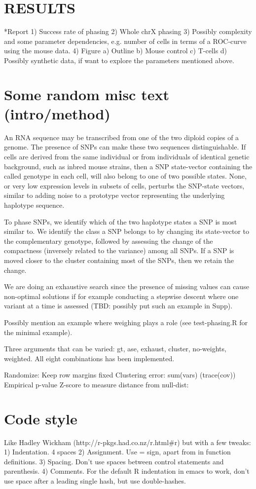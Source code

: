 \section{RESULTS}
*Report
1) Success rate of phasing
2) Whole chrX phasing
3) Possibly complexity and some parameter dependencies, e.g. number of
cells in terms of a ROC-curve using the mouse data.
4) Figure
a) Outline
b) Mouse control
c) T-cells
d) Possibly synthetic data, if want to explore the parameters mentioned above.


\section{Some random misc text (intro/method)}
An RNA sequence may be transcribed from one of the two diploid copies of a genome. The presence of SNPs can make these two sequences distinguishable. If cells are derived from the same individual or from individuals of identical genetic background, such as inbred mouse strains, then a SNP state-vector containing the called genotype in each cell, will also belong to one of two possible states. None, or very low expression levels in subsets of cells, perturbs the SNP-state vectors, similar to adding noise to a prototype vector representing the underlying haplotype sequence. 

To phase SNPs, we identify which of the two haplotype states a SNP is most similar to. We identify the class a SNP belongs to by changing its state-vector to the complementary genotype, followed by assessing the change of the compactness (inversely related to the variance) among all SNPs. If a SNP is moved closer to the cluster containing most of the SNPs, then we retain the change. 

We are doing an exhaustive search since the presence of missing values
can cause non-optimal solutions if for example conducting a stepwise
descent where one variant at a time is assessed (TBD: possibly put
such an example in Supp).

Possibly mention an example where weighing plays a role (see
test-phasing.R for the minimal example).

Three arguments that can be varied: {gt, ase}, {exhaust, cluster},
{no-weights, weighted}. All eight combinations has been implemented.

Randomize: Keep row margins fixed
Clustering error: sum(vars) (trace(cov))
Empirical p-value
Z-score to measure distance from null-dist: %

\section{Code style}
Like Hadley Wickham (http://r-pkgs.had.co.nz/r.html#r) but with a few tweaks:
1) Indentation. 4 spaces
2) Assignment. Use = sign, apart from in function definitions.
3) Spacing. Don't use spaces between control statements and parenthesis.
4) Comments. For the default R indentation in emacs to work, don't use space
after a leading single hash, but use double-hashes.